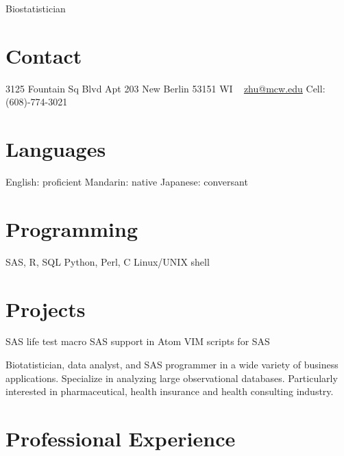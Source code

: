 \documentclass[11pt, print]{friggeri-cv}
\begin{document}
       {Biostatistician}

\begin{aside}
  \section{Contact}
    3125 Fountain Sq Blvd
    Apt 203
    New Berlin
    53151 WI
    ~
    \href{mailto:zhu@mcw.edu}{zhu@mcw.edu}
    Cell: (608)-774-3021
  \section{Languages}
    English: proficient
    Mandarin: native
    Japanese: conversant
  \section{Programming}
    SAS, R, SQL
    Python, Perl, C
    Linux/UNIX shell
  \section{Projects}
    SAS life test macro
    SAS support in Atom
    VIM scripts for SAS
\end{aside}

Biotatistician, data analyst, and SAS programmer in a wide variety of business applications. Specialize in analyzing large observational databases. Particularly interested in pharmaceutical, health insurance and health consulting industry.\\

\section{Professional Experience}
\end{document}
